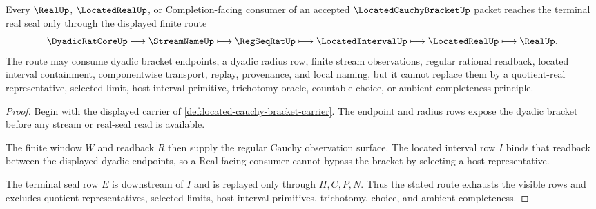 \begin{theorem}
\label{thm:located-cauchy-bracket-real-seal}
Every $\RealUp$, $\LocatedRealUp$, or Completion-facing consumer of an accepted $\LocatedCauchyBracketUp$ packet reaches the terminal real seal only through the displayed finite route
$$
\DyadicRatCoreUp
\longmapsto
\StreamNameUp
\longmapsto
\RegSeqRatUp
\longmapsto
\LocatedIntervalUp
\longmapsto
\LocatedRealUp
\longmapsto
\RealUp .
$$
The route may consume dyadic bracket endpoints, a dyadic radius row, finite stream observations, regular rational readback, located interval containment, componentwise transport, replay, provenance, and local naming, but it cannot replace them by a quotient-real representative, selected limit, host interval primitive, trichotomy oracle, countable choice, or ambient completeness principle.
\end{theorem}
\begin{proof}
Begin with the displayed carrier of \autoref{def:located-cauchy-bracket-carrier}. The endpoint and radius rows expose the dyadic bracket before any stream or real-seal read is available.

The finite window $W$ and readback $R$ then supply the regular Cauchy observation surface. The located interval row $I$ binds that readback between the displayed dyadic endpoints, so a Real-facing consumer cannot bypass the bracket by selecting a host representative.

The terminal seal row $E$ is downstream of $I$ and is replayed only through $H,C,P,N$. Thus the stated route exhausts the visible rows and excludes quotient representatives, selected limits, host interval primitives, trichotomy, choice, and ambient completeness.
\end{proof}


\begin{closurestatus}{\LocatedCauchyBracketUp}
  \theoryclosure{\seedClosure}
  \formalstatus{\unformalizedV}
\end{closurestatus}
